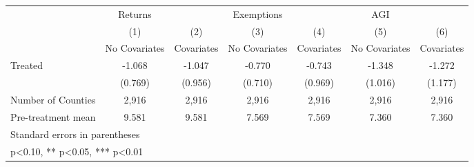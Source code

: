 {
\def\sym#1{\ifmmode^{#1}\else\(^{#1}\)\fi}
\begin{tabular}{l*{6}{c}}
\hline\hline
            &     Returns   &               &  Exemptions   &               &         AGI   &               \\
            &\multicolumn{1}{c}{(1)}&\multicolumn{1}{c}{(2)}&\multicolumn{1}{c}{(3)}&\multicolumn{1}{c}{(4)}&\multicolumn{1}{c}{(5)}&\multicolumn{1}{c}{(6)}\\
            &\multicolumn{1}{c}{No Covariates}&\multicolumn{1}{c}{Covariates}&\multicolumn{1}{c}{No Covariates}&\multicolumn{1}{c}{Covariates}&\multicolumn{1}{c}{No Covariates}&\multicolumn{1}{c}{Covariates}\\
\hline
Treated     &      -1.068   &      -1.047   &      -0.770   &      -0.743   &      -1.348   &      -1.272   \\
            &     (0.769)   &     (0.956)   &     (0.710)   &     (0.969)   &     (1.016)   &     (1.177)   \\
\hline
Number of Counties&       2,916   &       2,916   &       2,916   &       2,916   &       2,916   &       2,916   \\
Pre-treatment mean&       9.581   &       9.581   &       7.569   &       7.569   &       7.360   &       7.360   \\
\hline\hline
\multicolumn{7}{l}{\footnotesize Standard errors in parentheses}\\
\multicolumn{7}{l}{\footnotesize * p<0.10, ** p<0.05, *** p<0.01}\\
\end{tabular}
}
